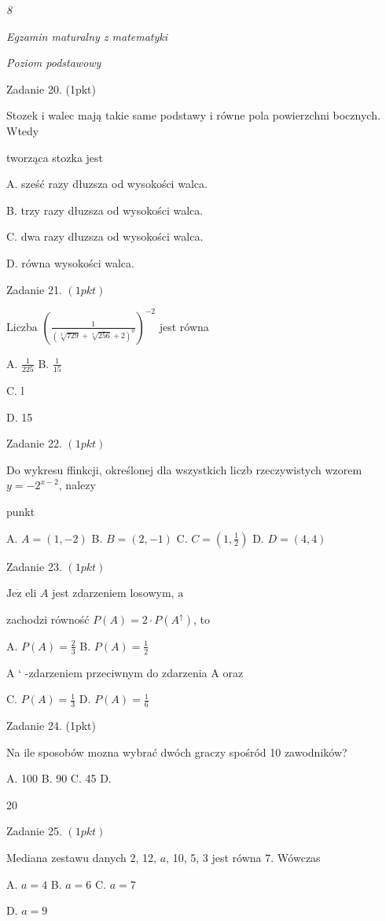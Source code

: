 \documentclass[a4paper,12pt]{article}
\begin{document}
{\it 8}

{\it Egzamin maturalny z matematyki}

{\it Poziom podstawowy}

Zadanie 20. (1pkt)

Stozek i walec mają takie same podstawy i równe pola powierzchni bocznych. Wtedy

tworząca stozka jest

A. sześć razy dłuzsza od wysokości walca.

B. trzy razy dłuzsza od wysokości walca.

C. dwa razy dłuzsza od wysokości walca.

D. równa wysokości walca.

Zadanie 21. $(1pkt)$

Liczba $(\displaystyle \frac{1}{(\sqrt[3]{729}+\sqrt[4]{256}+2)^{0}})^{-2}$ jest równa

A. $\displaystyle \frac{1}{225}$ B. $\displaystyle \frac{1}{15}$

C. l

D. 15

Zadanie 22. $(1pkt)$

Do wykresu ffinkcji, określonej dla wszystkich liczb rzeczywistych wzorem $y=-2^{x-2}$, nalez$\mathrm{y}$

punkt

A. $A=(1,-2)$ B. $B=(2,-1)$ C. $C=(1,\displaystyle \frac{1}{2})$ D. $D=(4,4)$

Zadanie 23. $(1pkt)$

$\mathrm{J}\mathrm{e}\dot{\mathrm{z}}$ eli $A$ jest zdarzeniem losowym, $\mathrm{a}$

zachodzi równość $P(A)=2\cdot P(A^{\uparrow})$, to

A. $P(A)=\displaystyle \frac{2}{3}$ B. $P(A)=\displaystyle \frac{1}{2}$

A ` -zdarzeniem przeciwnym do zdarzenia A oraz

C. $P(A)=\displaystyle \frac{1}{3}$ D. $P(A)=\displaystyle \frac{1}{6}$

Zadanie 24. (1pkt)

Na ile sposobów mozna wybrać dwóch graczy spośród 10 zawodników?

A. 100 B. 90 C. 45 D.

20

Zadanie 25. $(1pkt)$

Mediana zestawu danych 2, 12, $a$, 10, 5, 3 jest równa 7. Wówczas

A. $a=4$ B. $a=6$ C. $a=7$

D. $a=9$
\end{document}
